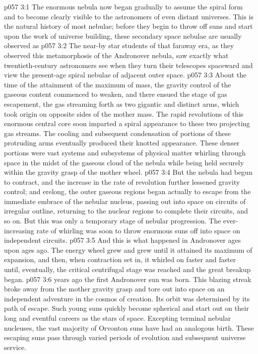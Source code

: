 \vs p057 3:1 The enormous nebula now began gradually to assume the spiral form and to become clearly visible to the astronomers of even distant universes. This is the natural history of most nebulae; before they begin to throw off suns and start upon the work of universe building, these secondary space nebulae are usually observed as 
\vs p057 3:2 The near\hyp{}by star students of that faraway era, as they observed this metamorphosis of the Andronover nebula, saw exactly what twentieth\hyp{}century astronomers see when they turn their telescopes spaceward and view the present\hyp{}age spiral nebulae of adjacent outer space.
\vs p057 3:3 About the time of the attainment of the maximum of mass, the gravity control of the gaseous content commenced to weaken, and there ensued the stage of gas escapement, the gas streaming forth as two gigantic and distinct arms, which took origin on opposite sides of the mother mass. The rapid revolutions of this enormous central core soon imparted a spiral appearance to these two projecting gas streams. The cooling and subsequent condensation of portions of these protruding arms eventually produced their knotted appearance. These denser portions were vast systems and subsystems of physical matter whirling through space in the midst of the gaseous cloud of the nebula while being held securely within the gravity grasp of the mother wheel.
\vs p057 3:4 But the nebula had begun to contract, and the increase in the rate of revolution further lessened gravity control; and erelong, the outer gaseous regions began actually to escape from the immediate embrace of the nebular nucleus, passing out into space on circuits of irregular outline, returning to the nuclear regions to complete their circuits, and so on. But this was only a temporary stage of nebular progression. The ever\hyp{}increasing rate of whirling was soon to throw enormous suns off into space on independent circuits.
\vs p057 3:5 And this is what happened in Andronover ages upon ages ago. The energy wheel grew and grew until it attained its maximum of expansion, and then, when contraction set in, it whirled on faster and faster until, eventually, the critical centrifugal stage was reached and the great breakup began.
\pc \vs p057 3:6  years ago the first Andronover sun was born. This blazing streak broke away from the mother gravity grasp and tore out into space on an independent adventure in the cosmos of creation. Its orbit was determined by its path of escape. Such young suns quickly become spherical and start out on their long and eventful careers as the stars of space. Excepting terminal nebular nucleuses, the vast majority of Orvonton suns have had an analogous birth. These escaping suns pass through varied periods of evolution and subsequent universe service.
